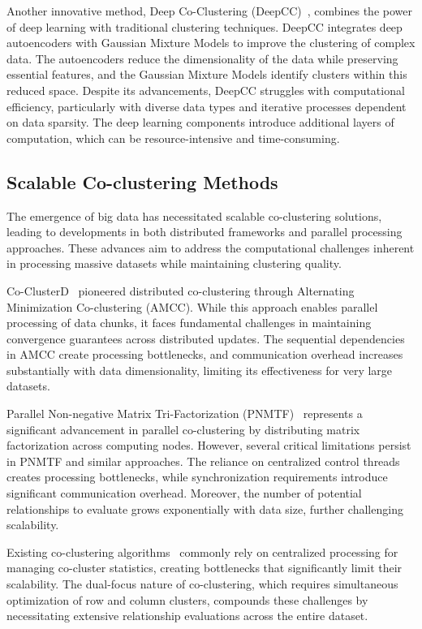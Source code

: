 \documentclass[journal]{IEEEtran}
\theoremstyle{definition}
\theoremstyle{remark} %
\renewcommand{\cite}[1]{~\autocite{#1}}
\begin{document}
Another innovative method, Deep Co-Clustering (DeepCC)\cite{dongkuanxu2019DeepCoClustering}, combines the power of deep learning with traditional clustering techniques. DeepCC integrates deep autoencoders with Gaussian Mixture Models to improve the clustering of complex data. The autoencoders reduce the dimensionality of the data while preserving essential features, and the Gaussian Mixture Models identify clusters within this reduced space. Despite its advancements, DeepCC struggles with computational efficiency, particularly with diverse data types and iterative processes dependent on data sparsity. The deep learning components introduce additional layers of computation, which can be resource-intensive and time-consuming.

\subsection{Scalable Co-clustering Methods}
The emergence of big data has necessitated scalable co-clustering solutions, leading to developments in both distributed frameworks and parallel processing approaches. These advances aim to address the computational challenges inherent in processing massive datasets while maintaining clustering quality.

Co-ClusterD\cite{cheng2015CoClusterDDistributedFramework} pioneered distributed co-clustering through Alternating Minimization Co-clustering (AMCC). While this approach enables parallel processing of data chunks, it faces fundamental challenges in maintaining convergence guarantees across distributed updates. The sequential dependencies in AMCC create processing bottlenecks, and communication overhead increases substantially with data dimensionality, limiting its effectiveness for very large datasets.

Parallel Non-negative Matrix Tri-Factorization (PNMTF)\cite{chen2023ParallelNonNegativeMatrix} represents a significant advancement in parallel co-clustering by distributing matrix factorization across computing nodes. However, several critical limitations persist in PNMTF and similar approaches. The reliance on centralized control threads creates processing bottlenecks, while synchronization requirements introduce significant communication overhead. Moreover, the number of potential relationships to evaluate grows exponentially with data size, further challenging scalability.

Existing co-clustering algorithms\cite{chen2023ParallelNonNegativeMatrix, cheng2015CoClusterDDistributedFramework} commonly rely on centralized processing for managing co-cluster statistics, creating bottlenecks that significantly limit their scalability. The dual-focus nature of co-clustering, which requires simultaneous optimization of row and column clusters, compounds these challenges by necessitating extensive relationship evaluations across the entire dataset.
\end{document}
